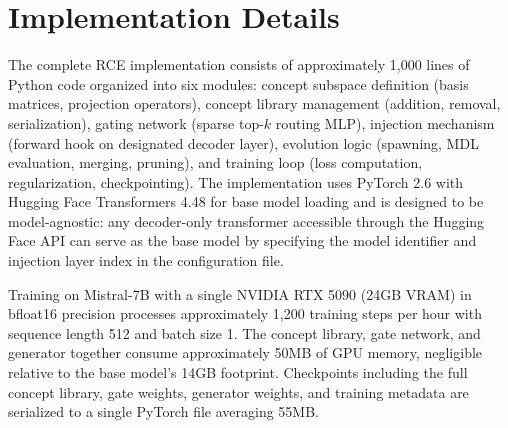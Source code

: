 \documentclass[11pt]{article}
\begin{document}
\section{Implementation Details}

The complete RCE implementation consists of approximately 1,000 lines of Python code organized into six modules: concept subspace definition (basis matrices, projection operators), concept library management (addition, removal, serialization), gating network (sparse top-$k$ routing MLP), injection mechanism (forward hook on designated decoder layer), evolution logic (spawning, MDL evaluation, merging, pruning), and training loop (loss computation, regularization, checkpointing). The implementation uses PyTorch 2.6 with Hugging Face Transformers 4.48 for base model loading and is designed to be model-agnostic: any decoder-only transformer accessible through the Hugging Face API can serve as the base model by specifying the model identifier and injection layer index in the configuration file.

Training on Mistral-7B with a single NVIDIA RTX 5090 (24GB VRAM) in bfloat16 precision processes approximately 1,200 training steps per hour with sequence length 512 and batch size 1. The concept library, gate network, and generator together consume approximately 50MB of GPU memory, negligible relative to the base model's 14GB footprint. Checkpoints including the full concept library, gate weights, generator weights, and training metadata are serialized to a single PyTorch file averaging 55MB. 
\end{document}

